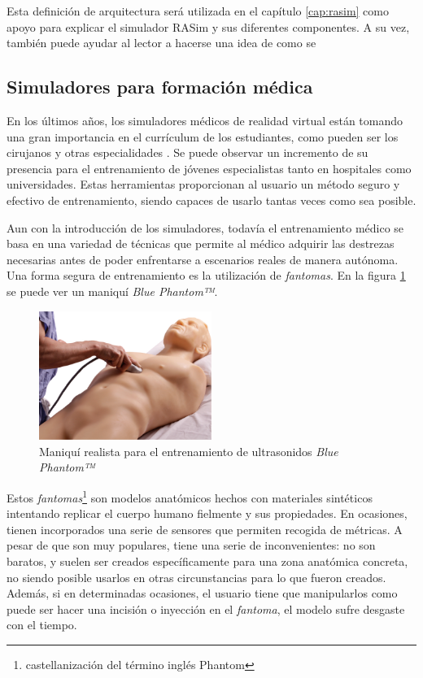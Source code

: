 Esta definición de arquitectura será utilizada en el capítulo \ref{cap:rasim} como apoyo para explicar el simulador \ac{RASim} y sus diferentes componentes. A su vez, también puede ayudar al lector a hacerse una idea de como se 





\subsection{Simuladores para formación médica}
\label{art:medicalsim}

En los últimos años, los simuladores médicos de realidad virtual están tomando una gran importancia en el currículum de los estudiantes, como pueden ser los cirujanos y otras especialidades \cite{PATEL2017266.e7}. Se puede observar un incremento de su presencia para el entrenamiento de jóvenes especialistas tanto en hospitales como universidades. Estas herramientas proporcionan al usuario un método seguro y efectivo de entrenamiento, siendo capaces de usarlo tantas veces como sea posible. 

Aun con la introducción de los simuladores, todavía el entrenamiento médico se basa en una variedad de técnicas que permite al médico adquirir las destrezas necesarias antes de poder enfrentarse a escenarios reales de manera autónoma. Una forma segura de entrenamiento es la utilización de \emph{fantomas}\cite{phantomra}. En la figura \ref{fig:phantom} se puede ver un maniquí \emph{Blue Phantom™}\cite{BluePH}.

\begin{figure}[h]
   \centering
    \includegraphics[width=0.5\textwidth]{IMG/fast_trauma.jpg}
    \caption{Maniquí realista para el entrenamiento de ultrasonidos \emph{Blue Phantom™}\cite{BluePH} }
   \label{fig:phantom}
\end{figure}

Estos \emph{fantomas}\footnote{castellanización del término inglés Phantom} son modelos anatómicos hechos con materiales sintéticos intentando replicar el cuerpo humano fielmente y sus propiedades. En ocasiones, tienen incorporados una serie de sensores que permiten recogida de métricas. A pesar de que son muy populares, tiene una serie de inconvenientes: no son baratos, y suelen ser creados específicamente para una zona anatómica concreta, no siendo posible usarlos en otras circunstancias para lo que fueron creados. Además, si en determinadas ocasiones, el usuario tiene que manipularlos como puede ser hacer una incisión o inyección en el \emph{fantoma}, el modelo sufre desgaste con el tiempo.

